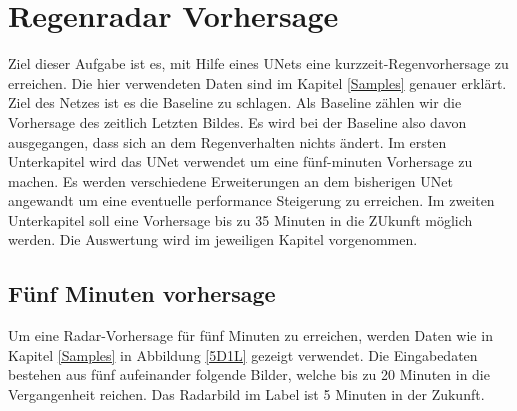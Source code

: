 \section{Regenradar Vorhersage}
Ziel dieser Aufgabe ist es, mit Hilfe eines UNets eine kurzzeit-Regenvorhersage zu erreichen. Die hier verwendeten Daten sind im Kapitel \ref{Samples} genauer erklärt. Ziel des Netzes ist es die Baseline zu schlagen. Als Baseline zählen wir die Vorhersage des zeitlich Letzten Bildes. Es wird bei der Baseline also davon ausgegangen, dass sich an dem Regenverhalten nichts ändert. Im ersten Unterkapitel wird das UNet verwendet um eine fünf-minuten Vorhersage zu machen. Es werden verschiedene Erweiterungen an dem bisherigen UNet angewandt um eine eventuelle performance Steigerung zu erreichen. Im zweiten Unterkapitel soll eine Vorhersage bis zu 35 Minuten in die ZUkunft möglich werden. Die Auswertung wird im jeweiligen Kapitel vorgenommen.

\subsection{Fünf Minuten vorhersage}
Um eine Radar-Vorhersage für fünf Minuten zu erreichen, werden Daten wie in Kapitel \ref{Samples} in Abbildung \ref{5D1L} gezeigt verwendet. Die Eingabedaten bestehen aus fünf aufeinander folgende Bilder, welche bis zu 20 Minuten in die Vergangenheit reichen. Das Radarbild im Label ist 5 Minuten in der Zukunft.

